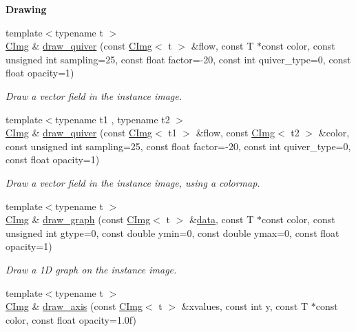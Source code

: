 \begin{Indent}{\bf Drawing}
\begin{DoxyCompactItemize}
\item 
{\footnotesize template$<$typename t $>$ }\\\hyperlink{structcimg__library_1_1_c_img}{CImg} \& \hyperlink{structcimg__library_1_1_c_img_a079ce9d49f9e495bd847288994c17df4}{draw\_\-quiver} (const \hyperlink{structcimg__library_1_1_c_img}{CImg}$<$ t $>$ \&flow, const T $\ast$const color, const unsigned int sampling=25, const float factor=-\/20, const int quiver\_\-type=0, const float opacity=1)
\begin{DoxyCompactList}\small\item\em Draw a vector field in the instance image. \item\end{DoxyCompactList}\item 
{\footnotesize template$<$typename t1 , typename t2 $>$ }\\\hyperlink{structcimg__library_1_1_c_img}{CImg} \& \hyperlink{structcimg__library_1_1_c_img_a4fe37c20a48b9bed4491f9e2e79a328e}{draw\_\-quiver} (const \hyperlink{structcimg__library_1_1_c_img}{CImg}$<$ t1 $>$ \&flow, const \hyperlink{structcimg__library_1_1_c_img}{CImg}$<$ t2 $>$ \&color, const unsigned int sampling=25, const float factor=-\/20, const int quiver\_\-type=0, const float opacity=1)
\begin{DoxyCompactList}\small\item\em Draw a vector field in the instance image, using a colormap. \item\end{DoxyCompactList}\item 
{\footnotesize template$<$typename t $>$ }\\\hyperlink{structcimg__library_1_1_c_img}{CImg} \& \hyperlink{structcimg__library_1_1_c_img_a8552386b1ccaeb71bc5dd56f8327d89b}{draw\_\-graph} (const \hyperlink{structcimg__library_1_1_c_img}{CImg}$<$ t $>$ \&\hyperlink{structcimg__library_1_1_c_img_a54f252b86f19b2217aef3ec9e1e2e013}{data}, const T $\ast$const color, const unsigned int gtype=0, const double ymin=0, const double ymax=0, const float opacity=1)
\begin{DoxyCompactList}\small\item\em Draw a 1D graph on the instance image. \item\end{DoxyCompactList}\item 
{\footnotesize template$<$typename t $>$ }\\\hyperlink{structcimg__library_1_1_c_img}{CImg} \& \hyperlink{structcimg__library_1_1_c_img_a92fff00514d8f0444ac4e53811c86397}{draw\_\-axis} (const \hyperlink{structcimg__library_1_1_c_img}{CImg}$<$ t $>$ \&xvalues, const int y, const T $\ast$const color, const float opacity=1.0f)

\end{DoxyCompactItemize}
\end{Indent}
